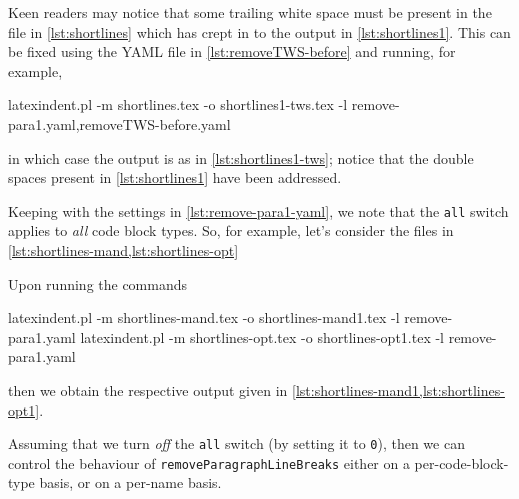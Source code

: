 	Keen readers may notice that some trailing white space must be present in the file in
	\cref{lst:shortlines} which has crept in to the output in
	\cref{lst:shortlines1}. This can be fixed using the YAML file in
	\vref{lst:removeTWS-before} and running, for example,
	\begin{commandshell}
latexindent.pl -m shortlines.tex -o shortlines1-tws.tex -l remove-para1.yaml,removeTWS-before.yaml  
    \end{commandshell}
	in which case the output is as in \cref{lst:shortlines1-tws}; notice that the double
	spaces present in \cref{lst:shortlines1} have been addressed.


	Keeping with the settings in \cref{lst:remove-para1-yaml}, we note that the
	\texttt{all} switch applies to \emph{all} code block
	types. So, for example, let's consider the files in \cref{lst:shortlines-mand,lst:shortlines-opt}

	\begin{minipage}{.45\linewidth}
	\end{minipage}
	\hfill
	\begin{minipage}{.45\linewidth}
	\end{minipage}

	Upon running the commands
	\begin{widepage}
		\begin{commandshell}
latexindent.pl -m shortlines-mand.tex -o shortlines-mand1.tex -l remove-para1.yaml
latexindent.pl -m shortlines-opt.tex -o shortlines-opt1.tex -l remove-para1.yaml
\end{commandshell}
	\end{widepage}

	then we obtain the respective output given in \cref{lst:shortlines-mand1,lst:shortlines-opt1}.


	Assuming that we turn \emph{off} the \texttt{all} switch
	(by setting it to \texttt{0}), then we can control the behaviour of
	\texttt{removeParagraphLineBreaks} either on a per-code-block-type basis, or on a per-name
	basis.

